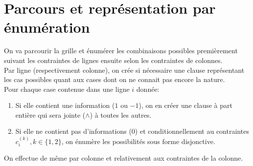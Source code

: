 \documentclass[a4paper,12pt]{report}
\begin{document}
\section{Parcours et représentation par énumération}


On va parcourir la grille et énumérer les combinaisons possibles premièrement suivant les contraintes de lignes ensuite selon les contraintes de colonnes.\\ 

Par ligne (respectivement colonne), on crée si nécessaire une clause représentant les cas possibles quant aux cases dont on ne connait pas encore la nature.\\

Pour chaque case contenue dans une ligne $i$ donnée:
\begin{enumerate}
\item Si elle contient une information ($1$ ou $-1$), on en créer une clause à part entière qui sera jointe ($\wedge$) à toutes les autres.
\item Si elle ne contient pas d'informations ($0$) et conditionnellement au contraintes $c_i^{(k)}, k\in\{1,2\}$, on énumère les possibilités sous forme disjonctive.\\
\end{enumerate}
On effectue de même par colonne et relativement aux contraintes de la colonne.\\


%
\end{document}
